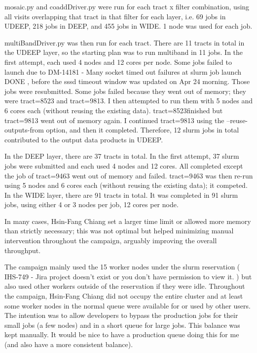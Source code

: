 mosaic.py and coaddDriver.py were run for each tract x filter combination, using all visits overlapping that tract in that filter for each layer, i.e. 69 jobs in UDEEP, 218 jobs in DEEP, and 455 jobs in WIDE. 1 node was used for each job.

multiBandDriver.py was then run for each tract.  There are 11 tracts in total in the UDEEP layer, so the starting plan was to run multiband in 11 jobs. In the first attempt, each used 4 nodes and 12 cores per node. Some jobs failed to launch due to  DM-14181 - Many socket timed out failures at slurm job launch DONE , before the sssd timeout window was updated on Apr 24 morning. Those jobs were resubmitted.   Some jobs failed because they went out of memory; they were tract=8523 and tract=9813. I then attempted to run them with 5 nodes and 6 cores each (without reusing the existing data).  tract=8523finished but tract=9813 went out of memory again. I continued  tract=9813 using the --reuse-outputs-from option, and then it completed. Therefore, 12 slurm jobs in total contributed to the output data products in UDEEP.

In the DEEP layer, there are 37 tracts in total. In the first attempt, 37 slurm jobs were submitted and each used 4 nodes and 12 cores. All completed except the job of tract=9463 went out of memory and failed. tract=9463 was then re-run using 5 nodes and 6 cores each (without reusing the existing data); it competed.  In the WIDE layer, there are 91 tracts in total. It was completed in 91 slurm jobs, using either 4 or 3 nodes per job, 12 cores per node.

In many cases, Hsin-Fang Chiang set a larger time limit or allowed more memory than strictly necessary; this was not optimal but helped minimizing manual intervention throughout the campaign, arguably improving the overall throughput.  

The campaign mainly used the 15 worker nodes under the slurm reservation ( IHS-749 - Jira project doesn't exist or you don't have permission to view it. ) but also used other workers outside of the reservation if they were idle.  Throughout the campaign, Hsin-Fang Chiang did not occupy the entire cluster and at least some worker nodes in the normal queue were available for or used by other users. The intention was to allow developers to bypass the production jobs for their small jobs (a few nodes) and in a short queue for large jobs. This balance was kept manually.  It would be nice to have a production queue doing this for me (and also have a more consistent balance).
